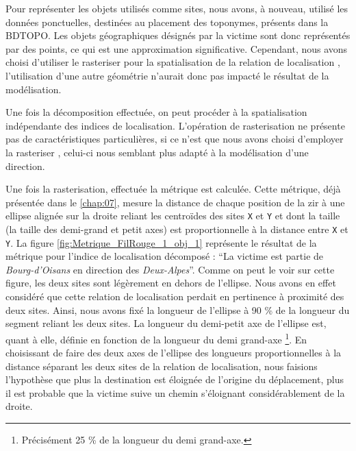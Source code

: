 Pour représenter les objets utilisés comme sites, nous avons, à
nouveau, utilisé les données ponctuelles, destinées au placement des
toponymes, présents dans la BDTOPO. Les objets géographiques désignés
par la victime sont donc représentés par des points, ce qui est une
approximation significative. Cependant, nous avons choisi d'utiliser
le rasteriser  pour la spatialisation de la
relation de localisation
, l'utilisation d'une
autre géométrie n'aurait donc pas impacté le résultat de la
modélisation.

Une fois la décomposition effectuée, on peut procéder à la
spatialisation indépendante des indices de localisation. L'opération
de rasterisation ne présente pas de caractéristiques particulières, si
ce n'est que nous avons choisi d'employer la rasteriser
, celui-ci nous semblant plus adapté à la
modélisation d'une direction.

Une fois la rasterisation, effectuée la métrique
 est calculée. Cette métrique, déjà
présentée dans le \autoref{chap:07}, mesure la distance de chaque
position de la \ac{zir} à une ellipse alignée sur la droite reliant
les centroïdes des sites \texttt{X} et \texttt{Y} et dont la taille
(\ie la taille des demi-grand et petit axes) est proportionnelle à la
distance entre \texttt{X} et \texttt{Y}. La figure
\ref{fig:Metrique_FilRouge_1_obj_1} représente le résultat de la
métrique pour l'indice de localisation décomposé : \enquote{La victime
  est partie de \emph{Bourg-d'Oisans} en direction des
  \emph{Deux-Alpes}}. Comme on peut le voir sur cette figure, les deux
sites sont légèrement en dehors de l'ellipse. Nous avons en effet
considéré que cette relation de localisation perdait en pertinence à
proximité des deux sites. Ainsi, nous avons fixé la longueur de
l'ellipse à 90 \% de la longueur du segment reliant les deux sites. La
longueur du demi-petit axe de l'ellipse est, quant à elle, définie en
fonction de la longueur du demi grand-axe \footnote{Précisément 25 \%
  de la longueur du demi grand-axe.}. En choisissant de faire des deux
axes de l'ellipse des longueurs proportionnelles à la distance
séparant les deux sites de la relation de localisation, nous faisions
l'hypothèse que plus la destination est éloignée de l'origine du
déplacement, plus il est probable que la victime suive un chemin
s'éloignant considérablement de la droite.

